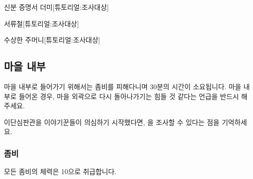 \documentclass{report}
\begin{document}
					\begin{spoiler}{신분 증명서 더미}{[튜토리얼:조사대상]}
					\end{spoiler}
					
					\begin{spoiler}{서류철}{[튜토리얼:조사대상]}
					\end{spoiler}
					
					\begin{spoiler}{수상한 주머니}{[튜토리얼:조사대상]}
					\end{spoiler}
				
			\subsection{마을 내부}
				마을 내부로 들어가기 위해서는 좀비를 피해다니며 30분의 시간이 소요됩니다. 마을 내부로 들어온 경우, 마을 외곽으로 다시 돌아나가기는 힘들 것 같다는 언급을 반드시 해주세요.
				
				이단심판관을 이야기꾼들이 의심하기 시작했다면, 을 조사할 수 있다는 점을 기억하세요.
				
				\hypertarget{search:zombie}{}
				\subsubsection*{좀비}
					모든 좀비의 체력은 10으로 취급합니다.
					
\end{document}
